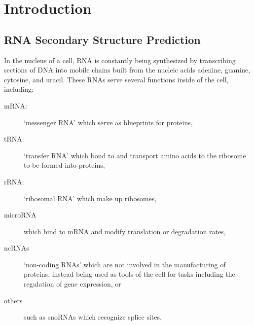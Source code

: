 \newcommand{\stack}[2]{\begin{array}{c}{ #1 \\ #2 }\end{array}}

\chapter{Introduction}

\section{RNA Secondary Structure Prediction}

In the nucleus of a cell, RNA is constantly being synthesized by
transcribing sections of DNA into mobile chains built from the nucleic
acids adenine, guanine, cytosine, and uracil. These RNAs serve several
functions inside of the cell, including:

\begin{description}
\item[mRNA:] `messenger RNA' which serve as blueprints for
  proteins,
\item[tRNA:] `transfer RNA' which bond to and transport amino acids
  to the ribosome to be formed into proteins,
\item[rRNA:] `ribosomal RNA' which make up ribosomes,
\item[microRNA] which bind to mRNA and modify translation or
  degradation rates, 
\item[ncRNAs] `non-coding RNAs'  which are not involved in the
  manufacturing of proteins, instead being used as tools of the cell
  for tasks including the regulation of gene expression, or
\item[others] such as snoRNAs which recognize splice sites.
\end{description} 

